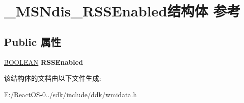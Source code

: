 \hypertarget{struct___m_s_ndis___r_s_s_enabled}{}\section{\+\_\+\+M\+S\+Ndis\+\_\+\+R\+S\+S\+Enabled结构体 参考}
\label{struct___m_s_ndis___r_s_s_enabled}
\subsection*{Public 属性}
\begin{DoxyCompactItemize}
\item 
\mbox{\label{struct___m_s_ndis___r_s_s_enabled_a0e900a2f6e8145147b12a21d30a635b5}} 
\hyperlink{_processor_bind_8h_a112e3146cb38b6ee95e64d85842e380a}{B\+O\+O\+L\+E\+AN} {\bfseries R\+S\+S\+Enabled}
\end{DoxyCompactItemize}


该结构体的文档由以下文件生成\+:\begin{DoxyCompactItemize}
\item 
E\+:/\+React\+O\+S-\/0../sdk/include/ddk/wmidata.\+h\end{DoxyCompactItemize}

